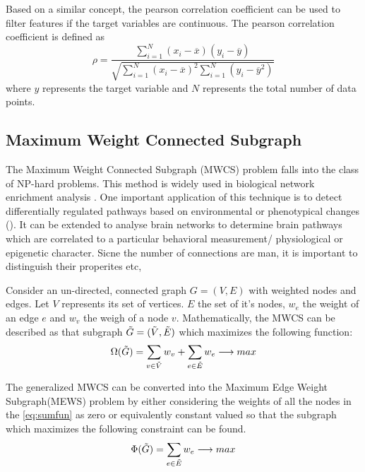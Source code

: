 \documentclass[msthesis.tex]{subfiles}
\begin{document}
Based on a similar concept, the pearson correlation coefficient can be used to filter features if the target variables are continuous. The pearson correlation coefficient is defined as 
\begin{equation}
    \rho = \frac{\sum_{i=1}^{N} (x_{i} - \overline{x}) (y_{i} - \overline{y})}
    {\sqrt{\sum_{i=1}^{N} (x_{i}-\overline{x})^2 \sum_{i=1}^{N} (y_{i}-\overline{y}^2)}}
\end{equation}
where $y$ represents the target variable and $N$ represents the total number of data points. 


\subsection{Maximum Weight Connected Subgraph}
\label{sec:MEWS}
The Maximum Weight Connected Subgraph (MWCS) problem falls into the class of NP-hard problems. This method is widely used in biological network enrichment analysis \cite{DBLP:journals/corr/LobodaAS16}. One important application of this technique is to detect
differentially regulated pathways based on environmental or phenotypical changes (\cite{althaus2014algorithms}). It can be extended to analyse brain networks to determine brain pathways which are correlated to a particular behavioral measurement/ physiological or epigenetic character. Sicne the number of connections are man, it is important to distinguish their properites etc, 

Consider an un-directed, connected graph $G = (V,E)$ with weighted nodes and edges. Let $V$ represents its set of vertices. $E$ the set of it's nodes, $w_e$ the weight of an edge $e$ and $w_v$ the weigh of a node $v$. Mathematically, the MWCS can be described as that subgraph  $\Tilde{G} = (\Tilde{V}, \Tilde{E})$ which maximizes the following function:
\begin{equation}
\label{eq:sumfun}
    \Omega(\Tilde{G}) = \sum_{v \in \Tilde{V}} w_v + \sum_{e \in \Tilde{E}} w_e \longrightarrow max
\end{equation}

The generalized MWCS can be converted into the Maximum Edge Weight Subgraph(MEWS) problem by either considering the weights of all the nodes in the  \autoref{eq:sumfun} as zero or equivalently constant valued so that the subgraph which maximizes the following constraint can be found.
\begin{equation}
    \label{eq:sumews}
    \Phi(\Tilde{G}) = \sum_{e \in \Tilde{E}} w_e \longrightarrow max
\end{equation}
\end{document}
